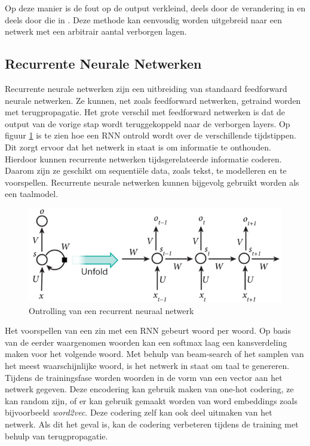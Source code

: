 Op deze manier is de fout op de output  verkleind, deels door de verandering in  en deels door die in . Deze methode kan eenvoudig worden uitgebreid naar een netwerk met een arbitrair aantal verborgen lagen.

\subsection{Recurrente Neurale Netwerken}
Recurrente neurale netwerken zijn een uitbreiding van standaard feedforward neurale netwerken. Ze kunnen, net zoals feedforward netwerken, getraind worden met terugpropagatie. Het grote verschil met feedforward netwerken is dat de output van de vorige stap wordt teruggekoppeld naar de verborgen layers. Op figuur \ref{fig:rnn} is te zien hoe een RNN ontrold wordt over de verschillende tijdstippen. Dit zorgt ervoor dat het netwerk in staat is om informatie te onthouden. Hierdoor kunnen recurrente netwerken tijdsgerelateerde informatie coderen. Daarom zijn ze geschikt om sequenti\"ele data, zoals tekst, te modelleren en te voorspellen. Recurrente neurale netwerken kunnen bijgevolg gebruikt worden als een taalmodel.

\begin{figure}[tb]
    \centering
    \includegraphics[width=\linewidth]{Images/rnn.PNG}
    \caption{Ontrolling van een recurrent neuraal netwerk}
    \label{fig:rnn}
\end{figure}

Het voorspellen van een zin met een RNN gebeurt woord per woord. Op basis van de eerder waargenomen woorden kan een softmax laag een kansverdeling maken voor het volgende woord. Met behulp van beam-search of het samplen van het meest waarschijnlijke woord, is het netwerk in staat om taal te genereren. Tijdens de trainingsfase worden woorden in de vorm van een vector aan het netwerk gegeven. Deze encodering kan gebruik maken van one-hot codering, ze kan random zijn, of er kan gebruik gemaakt worden van word embeddings zoals bijvoorbeeld \emph{word2vec}\cite{Mikolov2013}. Deze codering zelf kan ook deel uitmaken van het netwerk. Als dit het geval is, kan de codering verbeteren tijdens de training met behulp van terugpropagatie.

